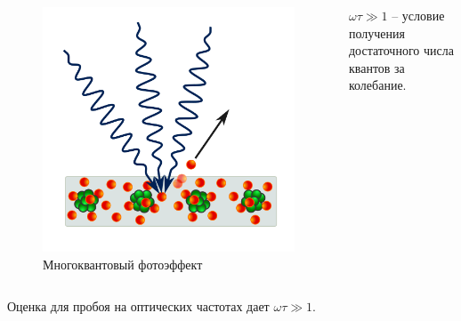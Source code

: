 \documentclass{beamer}
\begin{document}
\begin{frame}
\begin{columns}
			\begin{figure}
				\centering
				\includegraphics[width=0.7\linewidth]{res/multiphoton.png}
				\caption*{Многоквантовый фотоэффект}
			\end{figure}
			\footnotesize
			$\omega \tau \gg 1$ -- условие получения достаточного числа квантов за колебание.
		\end{columns}
		\vspace{10pt}
		Оценка для пробоя на оптических частотах дает $\omega \tau \gg 1$.

	\end{frame}
		
\end{document}
